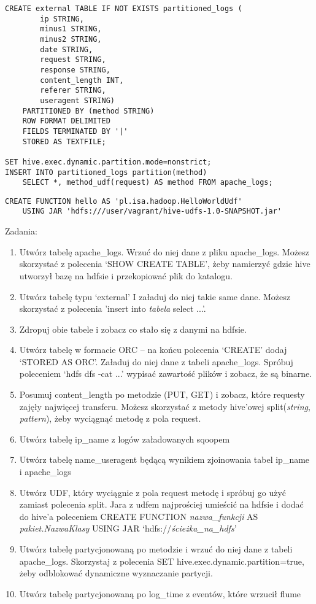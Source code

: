 \documentclass[11pt]{article}
\begin{document}
\pagebreak

\begin{lstlisting}
CREATE external TABLE IF NOT EXISTS partitioned_logs (
		ip STRING,
		minus1 STRING,
		minus2 STRING,
		date STRING,
		request STRING,
		response STRING,
		content_length INT,
		referer STRING,
		useragent STRING)
	PARTITIONED BY (method STRING)
	ROW FORMAT DELIMITED
	FIELDS TERMINATED BY '|'
	STORED AS TEXTFILE;
        
SET hive.exec.dynamic.partition.mode=nonstrict;
INSERT INTO partitioned_logs partition(method)
	SELECT *, method_udf(request) AS method FROM apache_logs;        
\end{lstlisting}

\begin{lstlisting}
CREATE FUNCTION hello AS 'pl.isa.hadoop.HelloWorldUdf'
	USING JAR 'hdfs:///user/vagrant/hive-udfs-1.0-SNAPSHOT.jar'
\end{lstlisting}

\pagebreak

Zadania:
\begin{enumerate}
\item Utwórz tabelę apache\_logs. Wrzuć do niej dane z pliku apache\_logs. Możesz skorzystać z polecenia ‘SHOW CREATE TABLE’, żeby namierzyć gdzie hive utworzył bazę na hdfsie i przekopiować plik do katalogu.
\item Utwórz tabelę typu ‘external’ I załaduj do niej takie same dane. Możesz skorzystać z polecenia 'insert into \textit{tabela} select ...'.
\item Zdropuj obie tabele i zobacz co stało się z danymi na hdfsie.
\item Utwórz tabelę w formacie ORC – na końcu polecenia ‘CREATE’ dodaj ‘STORED AS ORC’. Załaduj do niej dane z tabeli apache\_logs. Spróbuj poleceniem ‘hdfs dfs -cat ...’ wypisać zawartość plików i zobacz, że są binarne.
\item Posumuj content\_length po metodzie (PUT, GET) i zobacz, które requesty zajęły najwięcej transferu. Możesz skorzystać z metody hive’owej split(\textit{string}, \textit{pattern}), żeby wyciągnąć metodę z pola request.
\item Utwórz tabelę ip\_name z logów załadowanych sqoopem
\item Utwórz tabelę name\_useragent będącą wynikiem zjoinowania tabel ip\_name i apache\_logs
\item Utwórz UDF, który wyciągnie z pola request metodę i spróbuj go użyć zamiast polecenia split. Jara z udfem najprościej umieścić na hdfsie i dodać do hive’a poleceniem CREATE FUNCTION \textit{nazwa\_funkcji} AS \textit{pakiet.NazwaKlasy} USING JAR ‘hdfs://\textit{ścieżka\_na\_hdfs}’
\item Utwórz tabelę partycjonowaną po metodzie i wrzuć do niej dane z tabeli apache\_logs. Skorzystaj z polecenia SET hive.exec.dynamic.partition=true, żeby odblokować dynamiczne wyznaczanie partycji.
\item Utwórz tabelę partycjonowaną po log\_time z eventów, które wrzucił flume
\end{enumerate}
\end{document}
